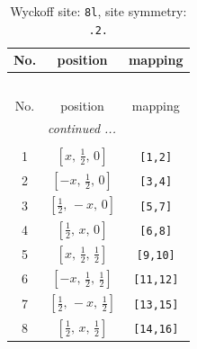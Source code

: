 \documentclass[fleqn,8pt]{jsarticle}
\begin{document}
\begin{longtable}{ccc}
\caption{Wyckoff site: {\tt 8l}, site symmetry: {\tt .2.}}
 \\
 \hline \hline
No. & position & mapping \\ \hline \endfirsthead

\multicolumn{2}{l}{\tablename\ \thetable{}} \\
 \hline \hline
No. & position & mapping \\ \hline \endhead

 \hline \hline
\multicolumn{2}{r}{\footnotesize\it continued ...} \\ \endfoot

 \hline \hline
\multicolumn{2}{r}{} \\ \endlastfoot

1 & $\left[ x,\, \frac{1}{2},\, 0 \right]$ & {\tt [1,2]} \\ \hline
2 & $\left[ - x,\, \frac{1}{2},\, 0 \right]$ & {\tt [3,4]} \\ \hline
3 & $\left[ \frac{1}{2},\, - x,\, 0 \right]$ & {\tt [5,7]} \\ \hline
4 & $\left[ \frac{1}{2},\, x,\, 0 \right]$ & {\tt [6,8]} \\ \hline
5 & $\left[ x,\, \frac{1}{2},\, \frac{1}{2} \right]$ & {\tt [9,10]} \\ \hline
6 & $\left[ - x,\, \frac{1}{2},\, \frac{1}{2} \right]$ & {\tt [11,12]} \\ \hline
7 & $\left[ \frac{1}{2},\, - x,\, \frac{1}{2} \right]$ & {\tt [13,15]} \\ \hline
8 & $\left[ \frac{1}{2},\, x,\, \frac{1}{2} \right]$ & {\tt [14,16]} \\
\end{longtable}
\renewcommand{\arraystretch}{1.2}
\end{document}
